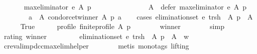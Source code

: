 \begin{isabellebody}
\ \ \isamarkupfalse%
\isanewline
\ \ \ \ {\isachardoublequoteopen}max{\isacharunderscore}{\kern0pt}eliminator\ e\ A\ p\ {\isacharequal}{\kern0pt}\isanewline
\ \ \ \ \ \ {\isacharparenleft}{\kern0pt}{\isacharbraceleft}{\kern0pt}{\isacharbraceright}{\kern0pt}{\isacharcomma}{\kern0pt}\isanewline
\ \ \ \ \ \ \ \ A\ {\isacharminus}{\kern0pt}\ defer\ {\isacharparenleft}{\kern0pt}max{\isacharunderscore}{\kern0pt}eliminator\ e{\isacharparenright}{\kern0pt}\ A\ p{\isacharcomma}{\kern0pt}\isanewline
\ \ \ \ \ \ \ \ {\isacharbraceleft}{\kern0pt}a\ {\isasymin}\ A{\isachardot}{\kern0pt}\ condorcet{\isacharunderscore}{\kern0pt}winner\ A\ p\ a{\isacharbraceright}{\kern0pt}{\isacharparenright}{\kern0pt}{\isachardoublequoteclose}\isanewline
\ \ \isamarkupfalse%
\ {\isacharparenleft}{\kern0pt}cases\ {\isachardoublequoteopen}elimination{\isacharunderscore}{\kern0pt}set\ e\ {\isacharparenleft}{\kern0pt}{\isacharquery}{\kern0pt}trsh{\isacharparenright}{\kern0pt}\ {\isacharparenleft}{\kern0pt}{\isacharless}{\kern0pt}{\isacharparenright}{\kern0pt}\ A\ p\ {\isasymnoteq}\ A{\isachardoublequoteclose}{\isacharparenright}{\kern0pt}\isanewline
\ \ \ \ \isamarkupfalse%
\ True\isanewline
\ \ \ \ \isamarkupfalse%
\ profile{\isacharcolon}{\kern0pt}\ {\isachardoublequoteopen}finite{\isacharunderscore}{\kern0pt}profile\ A\ p{\isachardoublequoteclose}\isanewline
\ \ \ \ \ \ \isamarkupfalse%
\ winner\isanewline
\ \ \ \ \ \ \isamarkupfalse%
\ simp\isanewline
\ \ \ \ \isamarkupfalse%
\ rating\ winner\ \isamarkupfalse%
\ {}{\isacharcolon}{\kern0pt}\isanewline
\ \ \ \ \ \ {\isachardoublequoteopen}{\isacharparenleft}{\kern0pt}elimination{\isacharunderscore}{\kern0pt}set\ e\ {\isacharquery}{\kern0pt}trsh\ {\isacharparenleft}{\kern0pt}{\isacharless}{\kern0pt}{\isacharparenright}{\kern0pt}\ A\ p{\isacharparenright}{\kern0pt}\ {\isacharequal}{\kern0pt}\ A\ {\isacharminus}{\kern0pt}\ {\isacharbraceleft}{\kern0pt}w{\isacharbraceright}{\kern0pt}{\isachardoublequoteclose}\isanewline
\ \ \ \ \ \ \isamarkupfalse%
\ cr{\isacharunderscore}{\kern0pt}eval{\isacharunderscore}{\kern0pt}imp{\isacharunderscore}{\kern0pt}dcc{\isacharunderscore}{\kern0pt}max{\isacharunderscore}{\kern0pt}elim{\isacharunderscore}{\kern0pt}helper{}\isanewline
\ \ \ \ \ \ \isamarkupfalse%
\ {\isacharparenleft}{\kern0pt}metis\ {\isacharparenleft}{\kern0pt}mono{\isacharunderscore}{\kern0pt}tags{\isacharcomma}{\kern0pt}\ lifting{\isacharparenright}{\kern0pt}{\isacharparenright}{\kern0pt}\isanewline

\end{isabellebody}
